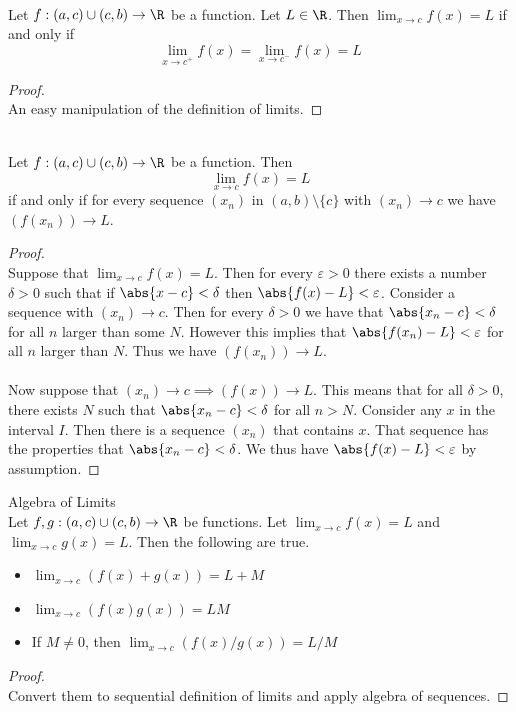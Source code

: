 \documentclass[a4paper]{article}
\begin{document}
\begin{lmm}{}{}\\
Let $f:(a,c)\cup(c,b)\to\R$ be a function. Let $L\in\R$. Then $\lim_{x\to c}f(x)=L$ if and only if $$\lim_{x\to c^+}f(x)=\lim_{x\to c^-}f(x)=L$$ 
\begin{proof}\\ An easy manipulation of the definition of limits. 
\end{proof}
\end{lmm}

\begin{prp}{}{}\\
Let $f:(a,c)\cup(c,b)\to\R$ be a function. Then $$\lim_{x\to c}f(x)=L$$ if and only if for every sequence $(x_n)$ in $(a,b)\setminus\{c\}$ with $(x_n)\to c$ we have $(f(x_n))\to L$. 
\begin{proof}\\ Suppose that $\lim_{x\to c}f(x)=L$. Then for every $\varepsilon>0$ there exists a number $\delta>0$ such that if $\abs{x-c}<\delta$ then $\abs{f(x)-L}<\varepsilon$. Consider a sequence with $(x_n)\to c$. Then for every $\delta>0$ we have that $\abs{x_n-c}<\delta$ for all $n$ larger than some $N$. However this implies that $\abs{f(x_n)-L}<\varepsilon$ for all $n$ larger than $N$. Thus we have $(f(x_n))\to L$. \\~\\ 
Now suppose that $(x_n)\to c\implies (f(x))\to L$. This means that for all $\delta>0$, there exists $N$ such that $\abs{x_n-c}<\delta$ for all $n>N$. Consider any $x$ in the interval $I$. Then there is a sequence $(x_n)$ that contains $x$. That sequence has the properties that $\abs{x_n-c}<\delta$. We thus have $\abs{f(x)-L}<\varepsilon$ by assumption. 
\end{proof}
\end{prp}

\begin{prp}{Algebra of Limits}{}\\ Let $f,g:(a,c)\cup(c,b)\to\R$ be functions. Let $\lim_{x\to c}f(x)=L$ and $\lim_{x\to c}g(x)=L$. Then the following are true. 
\begin{itemize}
\item $\lim_{x\to c}\left(f(x)+g(x)\right)=L+M$
\item $\lim_{x\to c}\left(f(x)g(x)\right)=LM$
\item If $M\neq 0$, then $\lim_{x\to c}(f(x)/g(x))=L/M$
\end{itemize}
\begin{proof}\\ Convert them to sequential definition of limits and apply algebra of sequences. 
\end{proof}
\end{prp}
\end{document}
